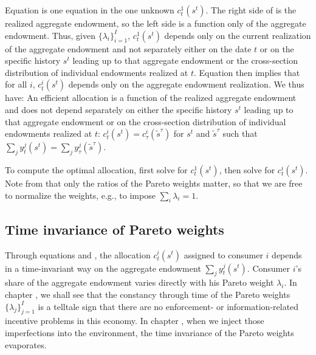 Equation  is one equation in the one unknown  $c_t^1(s^t)$. The right
side of  is the realized aggregate endowment, so the
left side is  a function only of the aggregate endowment. Thus, given $\{\lambda_i\}_{i=1}^I$,
$c_t^1(s^t)$ depends only on the current realization of the
aggregate endowment and not separately  either on  the date $t$ or on the specific history $s^t$
leading up to that aggregate endowment or  the cross-section distribution of individual
endowments realized at $t$. Equation  then implies that for all $i$,
$c_t^i(s^t)$ depends only on the aggregate endowment realization.
We thus have:
\medskip
{} An efficient allocation is a function of
the realized aggregate endowment and  does not depend separately  on either the specific history $s^t$
leading up to that aggregate endowment or on the cross-section distribution of individual
endowments realized at $t$: $c_t^i(s^t)=c_\tau^i(\tilde
s^{\tau})$ for $s^t$ and $\tilde s^{\tau}$ such that $\sum_j
y_t^j(s^t) = \sum_j y_\tau^j(\tilde s^{\tau})$.
\medskip

 To compute the optimal allocation, first solve  
for $c_t^1(s^t)$, then solve  for $c_t^i(s^t)$.
Note  from  that only the ratios of the Pareto weights matter,
so that we are free to normalize the weights, e.g., to impose
$\sum_i \lambda_i=1$.



\subsection{Time invariance of Pareto weights}
  Through  equations  and ,
the allocation $c_t^i(s^t)$ assigned to consumer $i$
depends in a time-invariant way on the aggregate endowment
$\sum_j y_t^j(s^t)$.  Consumer $i$'s share of the aggregate endowment varies
directly with his Pareto weight $\lambda_i$.   In chapter
, we shall see that the constancy through
time of the Pareto weights
 $\{\lambda_j\}_{j=1}^I$ is a telltale sign that there are no
enforcement- or information-related  incentive problems
in this economy. In chapter , when we inject those imperfections  into the environment, the time invariance of the Pareto
weights evaporates.
%


